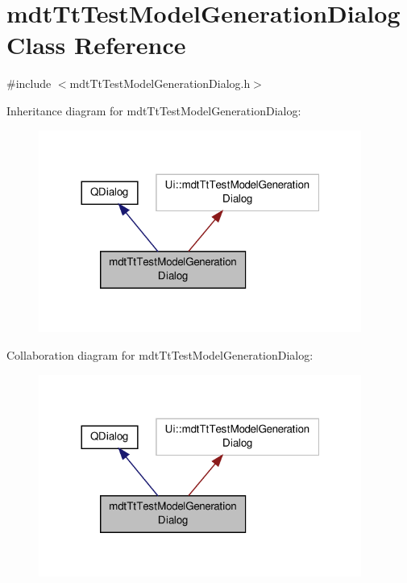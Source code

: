\hypertarget{classmdt_tt_test_model_generation_dialog}{\section{mdt\-Tt\-Test\-Model\-Generation\-Dialog Class Reference}
\label{classmdt_tt_test_model_generation_dialog}
}


{\ttfamily \#include $<$mdt\-Tt\-Test\-Model\-Generation\-Dialog.\-h$>$}



Inheritance diagram for mdt\-Tt\-Test\-Model\-Generation\-Dialog\-:\nopagebreak
\begin{figure}[H]
\begin{center}
\leavevmode
\includegraphics[width=300pt]{classmdt_tt_test_model_generation_dialog__inherit__graph}
\end{center}
\end{figure}


Collaboration diagram for mdt\-Tt\-Test\-Model\-Generation\-Dialog\-:\nopagebreak
\begin{figure}[H]
\begin{center}
\leavevmode
\includegraphics[width=300pt]{classmdt_tt_test_model_generation_dialog__coll__graph}
\end{center}
\end{figure}
